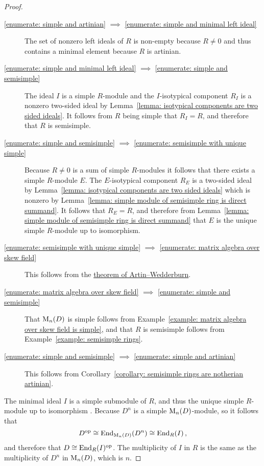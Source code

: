 \begin{proof}
  \label{proof: wedderburns theorem first proof}
  \leavevmode
  \begin{description}
    \item[\ref*{enumerate: simple and artinian} $\implies$ \ref*{enumerate: simple and minimal left ideal}]
      The set of nonzero left ideals of $R$ is non-empty because $R \neq 0$ and thus contains a minimal element because $R$ is artinian.
    \item[\ref*{enumerate: simple and minimal left ideal} $\implies$ \ref*{enumerate: simple and semisimple}]
      The ideal $I$ is a simple $R$-module and the $I$-isotypical component $R_I$ is a nonzero two-sided ideal by Lemma~\ref{lemma: isotypical components are two sided ideals}.
      It follows from $R$ being simple that $R_I = R$, and therefore that $R$ is semisimple.
    \item[\ref*{enumerate: simple and semisimple} $\implies$ \ref*{enumerate: semisimple with unique simple}]
      Because $R \neq 0$ is a sum of simple $R$-modules it follows that there exists a simple $R$-module $E$.
      The $E$-isotypical component $R_E$ is a two-sided ideal by Lemma~\ref{lemma: isotypical components are two sided ideals} which is nonzero by Lemma~\ref{lemma: simple module of semisimple ring is direct summand}.
      It follows that $R_E = R$, and therefore from Lemma~\ref{lemma: simple module of semisimple ring is direct summand} that $E$ is the unique simple $R$-module up to isomorphism.
    \item[\ref*{enumerate: semisimple with unique simple} $\implies$ \ref*{enumerate: matrix algebra over skew field}]
      This follows from the \hyperref[theorem: artin wedderburn theorem]{theorem of Artin--Wedderburn}.
    \item[\ref*{enumerate: matrix algebra over skew field} $\implies$ \ref*{enumerate: simple and semisimple}]
      That $\operatorname{M}_n(D)$ is simple follows from Example~\ref*{example: matrix algebra over skew field is simple}, and that $R$ is semisimple follows from Example~\ref{example: semisimple rings}.
    \item[\ref*{enumerate: simple and semisimple} $\implies$ \ref*{enumerate: simple and artinian}]
      This follows from Corollary~\ref{corollary: semisimple rings are notherian artinian}.
  \end{description}
  The minimal ideal $I$ is a simple submodule of $R$, and thus the unique simple $R$-module up to isomorphism .
  Because $D^n$ is a simple $\operatorname{M}_n(D)$-module, so it follows that
  \[
          D^{\operatorname{op}}
    \cong \operatorname{End}_{\operatorname{M}_n(D)}(D^n)
    \cong \operatorname{End}_R(I) \,,
  \]
  and therefore that $D \cong \operatorname{End}_R(I)^{\operatorname{op}}$.
  The multiplicity of $I$ in $R$ is the same as the multiplicity of $D^n$ in $\operatorname{M}_n(D)$, which is $n$.
\end{proof}




